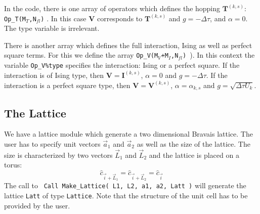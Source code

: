 In the code, there is one array of operators which defines the hopping $\pmb{T}^{(k,s)} $:  \texttt{Op\_T(M$_T$,N$_{fl}$)} .  In this case $\bm{V}$ corresponds to $\bm{T}^{(k,s)}$ and $g=-\Delta \tau$, 
and $\alpha = 0$.  The type variable is irrelevant. 

  There is another array   which defines the full interaction,  Ising as well as perfect square terms. For this  we define  the array \texttt{Op\_V(M$_V$+M$_I$,N$_{fl}$) }). In this context the variable \texttt{Op\_V\%type} specifies the interaction: Ising or  a perfect square.  If the interaction is of Ising type, then  $\bm{V}  = \bm{I}^{(k,s)} $, $\alpha = 0$ and $g = -\Delta \tau$.  
  If the interaction is a perfect square type, then  $\bm{V}  = \bm{V}^{(k,s)} $, $\alpha = \alpha_{k,s}$ and $g = \sqrt{\Delta \tau  U_k}$.  





\subsection{The Lattice}

We have a lattice module  which  generate  a two dimensional Bravais lattice.  The user has to specify unit vectors $\vec{a}_1$ and $\vec{a}_2$ as well as   the size of the  lattice. The size is  characterized by  two vectors $\vec{L}_1$ and $\vec{L}_2$   and  the lattice is placed on a torus: 
\begin{equation}
	\hat{c}_{\vec{i} + \vec{L}_1 }  = \hat{c}_{\vec{i} + \vec{L}_2 }  = \hat{c}_{\vec{i}}
\end{equation}
The call to 
\texttt{ Call Make\_Lattice( L1, L2, a1,  a2, Latt )} will generate the lattice   \texttt{Latt} of type \texttt{Lattice}.   Note that  the structure of the unit cell has to be provided by the user. 
 
